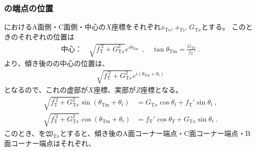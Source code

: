 \subsubsection{\TopCurvedOutcut の端点の位置}
\TopEndFace におけるA面側・C面側・中心の$X$座標をそれぞれ$x_\mathrm{To}$, $x_\mathrm{Ti}$, $G_{\mathrm Tx}$とする。
このとき\TopEndFace のそれぞれの位置は
\begin{align}
  \text{中心：}\quad
  \sqrt{f_\mathrm T^{'2}+G_{\mathrm Tx}^2}e^{i\theta_\mathrm{Tm}}~~, \quad
  \tan\theta_\mathrm{Tm} = \frac{G_{\mathrm Tx}}{f_\mathrm T'}\ .
\end{align}
より、傾き後の\nameTopEndFace の中心の位置は、
\begin{align*}
  \sqrt{f_\mathrm T^{'2}+G_{\mathrm Tx}^2}e^{i(\theta_\mathrm{Tm}+\theta_t)}
\end{align*}
となるので、これの虚部が$X$座標、実部が$Z$座標となる。
\begin{align*}
  \sqrt{f_\mathrm T^{'2}+G_{\mathrm Tx}^2}\sin(\theta_\mathrm{Tm}+\theta_t)
  &= G_{\mathrm Tx}\cos\theta_t+f_\mathrm T'\sin\theta_t~,\\
  \sqrt{f_\mathrm T^{'2}+G_{\mathrm Tx}^2}\cos(\theta_\mathrm{Tm}+\theta_t)
  &= f_\mathrm T'\cos\theta_T+G_{\mathrm Tx}\sin\theta_t~.
\end{align*}
このとき、\TopOutcutACWidth を$\mathfrak W_{\mathrm Tx}$とすると、傾き後のA面コーナー端点・C面コーナー端点・B面コーナー端点はそれぞれ、
